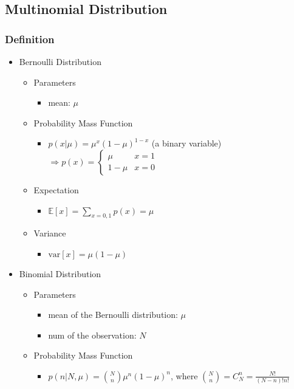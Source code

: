 \subsection{Multinomial Distribution}

\subsubsection{Definition}
\begin{itemize}
\item Bernoulli Distribution	
	\begin{itemize}
	\item Parameters
		\begin{itemize}
		\item mean: $\mu$
		\end{itemize}
	\item Probability Mass Function
		\begin{itemize}
		\item $p(x|\mu) = \mu^x(1-\mu)^{1-x}$ (a binary variable) \\
		$\Rightarrow p(x) = \begin{cases} \mu & x=1 \\ 1-\mu & x=0  \end{cases}$
		\end{itemize}
	\item Expectation
		\begin{itemize}
		\item $\mathbb E [x] = \sum_{x=0,1} p(x) = \mu$
		\end{itemize}
	\item Variance
		\begin{itemize}
		\item $\text{var} [x] = \mu(1-\mu)$
		\end{itemize}
	\end{itemize}
\item Binomial Distribution
	\begin{itemize}
	\item Parameters
		\begin{itemize}
		\item mean of the Bernoulli distribution: $\mu$
		\item num of the observation: $N$
		\end{itemize}
	\item Probability Mass Function
		\begin{itemize}
		\item $p(n|N, \mu) = \binom{N}{n}\mu^n (1-\mu)^n$, where $ \binom{N}{n} = C_N^n = \frac{N!}{(N-n)!n!}$ \\

\end{itemize}
\end{itemize}
\end{itemize}
